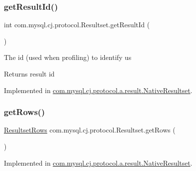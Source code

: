 \mbox{\label{interfacecom_1_1mysql_1_1cj_1_1protocol_1_1_resultset_a77886132904378ea915db2b4803e588c}} 
\subsubsection{\texorpdfstring{get\+Result\+Id()}{getResultId()}}
{\footnotesize\ttfamily int com.\+mysql.\+cj.\+protocol.\+Resultset.\+get\+Result\+Id (\begin{DoxyParamCaption}{ }\end{DoxyParamCaption})}

The id (used when profiling) to identify us

\begin{DoxyReturn}{Returns}
result id 
\end{DoxyReturn}


Implemented in \mbox{\hyperlink{classcom_1_1mysql_1_1cj_1_1protocol_1_1a_1_1result_1_1_native_resultset_ad10ec652380313c1eb2cb1dd67c4ea7e}{com.\+mysql.\+cj.\+protocol.\+a.\+result.\+Native\+Resultset}}.

\mbox{\label{interfacecom_1_1mysql_1_1cj_1_1protocol_1_1_resultset_a56ff0f26904a612a034bf839cae46d51}} 
\subsubsection{\texorpdfstring{get\+Rows()}{getRows()}}
{\footnotesize\ttfamily \mbox{\hyperlink{interfacecom_1_1mysql_1_1cj_1_1protocol_1_1_resultset_rows}{Resultset\+Rows}} com.\+mysql.\+cj.\+protocol.\+Resultset.\+get\+Rows (\begin{DoxyParamCaption}{ }\end{DoxyParamCaption})}



Implemented in \mbox{\hyperlink{classcom_1_1mysql_1_1cj_1_1protocol_1_1a_1_1result_1_1_native_resultset_a7f78b25cd2c764cf15975f10767d0de8}{com.\+mysql.\+cj.\+protocol.\+a.\+result.\+Native\+Resultset}}.

